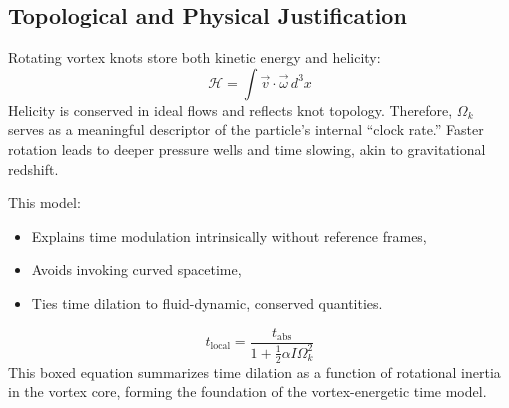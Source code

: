 \subsection{Topological and Physical Justification}

Rotating vortex knots store both kinetic energy and helicity:
\[
    \mathcal{H} = \int \vec{v} \cdot \vec{\omega} \, d^3x
\]
Helicity is conserved in ideal flows and reflects knot topology. Therefore, $\Omega_k$ serves as a meaningful descriptor of the particle’s internal “clock rate.” Faster rotation leads to deeper pressure wells and time slowing, akin to gravitational redshift.

This model:
\begin{itemize}
    \item Explains time modulation intrinsically without reference frames,
    \item Avoids invoking curved spacetime,
    \item Ties time dilation to fluid-dynamic, conserved quantities.
\end{itemize}

\begin{equation}
    \boxed{
        t_{\text{local}} = \frac{t_{\text{abs}}}{1 + \frac{1}{2} \alpha I \Omega_k^2}
    }
\end{equation}
This boxed equation summarizes time dilation as a function of rotational inertia in the vortex core, forming the foundation of the vortex-energetic time model.
